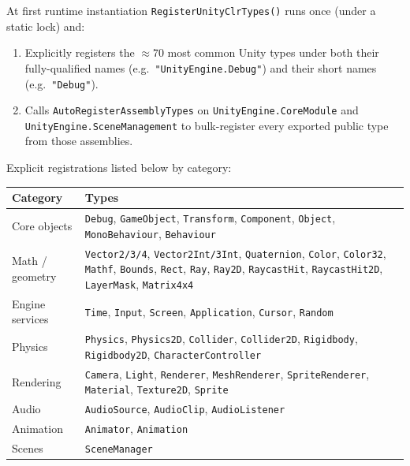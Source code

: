 \documentclass[11pt,a4paper]{article}
\newcommand{\code}[1]{\texttt{\small #1}}
\begin{document}
At first runtime instantiation \code{RegisterUnityClrTypes()} runs once (under a
static lock) and:

\begin{enumerate}[leftmargin=2em]
  \item Explicitly registers the \(\approx 70\) most common Unity types under
        both their fully-qualified names (e.g.\ \texttt{"UnityEngine.Debug"}) and
        their short names (e.g.\ \texttt{"Debug"}).
  \item Calls \code{AutoRegisterAssemblyTypes} on
        \texttt{UnityEngine.CoreModule} and
        \texttt{UnityEngine.SceneManagement} to bulk-register every exported public
        type from those assemblies.
\end{enumerate}

Explicit registrations listed below by category:

\begin{center}
\begin{tabular}{ll}
  \toprule
  \textbf{Category} & \textbf{Types} \\
  \midrule
  Core objects      & \code{Debug}, \code{GameObject}, \code{Transform},
                      \code{Component}, \code{Object},
                      \code{MonoBehaviour}, \code{Behaviour} \\
  Math / geometry   & \code{Vector2/3/4}, \code{Vector2Int/3Int},
                      \code{Quaternion}, \code{Color}, \code{Color32},
                      \code{Mathf}, \code{Bounds}, \code{Rect},
                      \code{Ray}, \code{Ray2D},
                      \code{RaycastHit}, \code{RaycastHit2D},
                      \code{LayerMask}, \code{Matrix4x4} \\
  Engine services   & \code{Time}, \code{Input}, \code{Screen},
                      \code{Application}, \code{Cursor}, \code{Random} \\
  Physics           & \code{Physics}, \code{Physics2D}, \code{Collider},
                      \code{Collider2D}, \code{Rigidbody}, \code{Rigidbody2D},
                      \code{CharacterController} \\
  Rendering         & \code{Camera}, \code{Light}, \code{Renderer},
                      \code{MeshRenderer}, \code{SpriteRenderer},
                      \code{Material}, \code{Texture2D}, \code{Sprite} \\
  Audio             & \code{AudioSource}, \code{AudioClip},
                      \code{AudioListener} \\
  Animation         & \code{Animator}, \code{Animation} \\
  Scenes            & \code{SceneManager} \\
  \bottomrule
\end{tabular}
\end{center}
\end{document}

